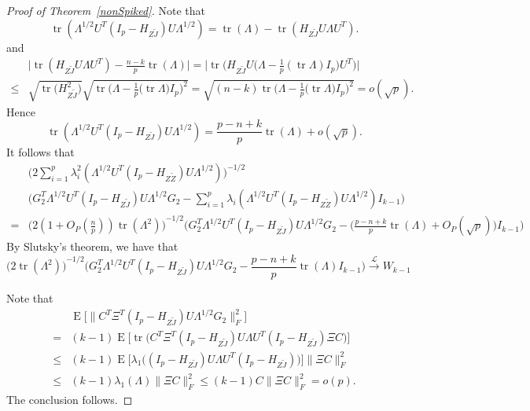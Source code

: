 \documentclass[review]{elsarticle}
\DeclareMathOperator{\mytr}{tr}
\DeclareMathOperator{\myE}{E}
\theoremstyle{plain}
\theoremstyle{definition}
\theoremstyle{remark}
\begin{document}
\begin{proof}[\textrm{Proof of Theorem~\ref{nonSpiked}}]
Note that
    $$
    \mytr(\Lambda^{1/2}U^T (I_p-H_{Z\tilde{J}})U\Lambda^{1/2})
    =
    \mytr(\Lambda)-\mytr(H_{Z\tilde{J}}U\Lambda U^T).
    $$ 
and
    $$
    \begin{aligned}
        &
        \big|
    \mytr(H_{Z\tilde{J}}U\Lambda U^T)
    -\frac{n-k}{p}\mytr(\Lambda)
    \big|
    =
    \big|
    \mytr\Big(H_{Z\tilde{J}} U \big(\Lambda-\frac{1}{p} (\mytr \Lambda) I_p \big) U^T\Big)
    \big|
        \\
        \leq &
        \sqrt{\mytr \big(H_{Z\tilde{J}}^2\big)}
        \sqrt{\mytr \Big(\Lambda-\frac{1}{p}\big(\mytr \Lambda\big) I_p\Big)^2}
        =\sqrt{(n-k)\mytr \Big(\Lambda-\frac{1}{p}\big(\mytr \Lambda\big) I_p\Big)^2}
        =o(\sqrt{p}).
    \end{aligned}
    $$
    Hence 
    $$
    \mytr(\Lambda^{1/2}U^T (I_p-H_{Z\tilde{J}})U\Lambda^{1/2})
    =
    \frac{p-n+k}{p}\mytr(\Lambda)+o(\sqrt{p}).
    $$
    It follows that
    $$
    \begin{aligned}
        &\Big(2\sum_{i=1}^p \lambda_i^2(\Lambda^{1/2}U^T(I_p-H_{Z\tilde{Z}})U\Lambda^{1/2})\Big)^{-1/2}\\
        &{\Big( G_2^T \Lambda^{1/2}U^T (I_p-H_{Z\tilde{J}})U\Lambda^{1/2}G_2-\sum_{i=1}^p \lambda_i(\Lambda^{1/2}U^T(I_p-H_{Z\tilde{Z}})U\Lambda^{1/2})I_{k-1}\Big)}\\
        =&
        {\Big( 2(1+O_P(\frac{n}{p}))\mytr (\Lambda^2)\Big) }^{-1/2} {\Big( G_2^T \Lambda^{1/2}U^T (I_p-H_{Z\tilde{J}})U\Lambda^{1/2}G_2-
        \big(\frac{p-n+k}{p}\mytr(\Lambda)+O_P(\sqrt{p})\big)I_{k-1}
        \Big)}
    \end{aligned}
    $$
    By Slutsky's theorem, we have that
    $$
    {\Big(2\mytr (\Lambda^2)\Big)}^{-1/2}{\Big( G_2^T \Lambda^{1/2}U^T (I_p-H_{Z\tilde{J}})U\Lambda^{1/2}G_2-
        \frac{p-n+k}{p}\mytr(\Lambda)I_{k-1}\Big)}
    \xrightarrow{\mathcal{L}}W_{k-1}
    $$

    Note that
    $$
    \begin{aligned}
        &\myE\big[\| C^T \Xi^T (I_p-H_{Z\tilde{J}})U\Lambda^{1/2}G_2\|_F^2\big]\\
        = &
        (k-1)\myE \big[\mytr\big(
        C^T \Xi^T (I_p-H_{Z\tilde{J}})U\Lambda U^T (I_p-H_{Z\tilde{J}})\Xi C
        \big)\big]\\
        \leq &
        (k-1)\myE \big[\lambda_1\big(
         (I_p-H_{Z\tilde{J}})U\Lambda U^T (I_p-H_{Z\tilde{J}})
        \big)\big]
        \|\Xi C\|_F^2\\
        \leq &
        (k-1)\lambda_1(\Lambda)\|\Xi C\|_F^2
        \leq 
        (k-1)C\|\Xi C\|_F^2=o(p).
    \end{aligned}
    $$
    The conclusion follows.
\end{proof}
\end{document}
